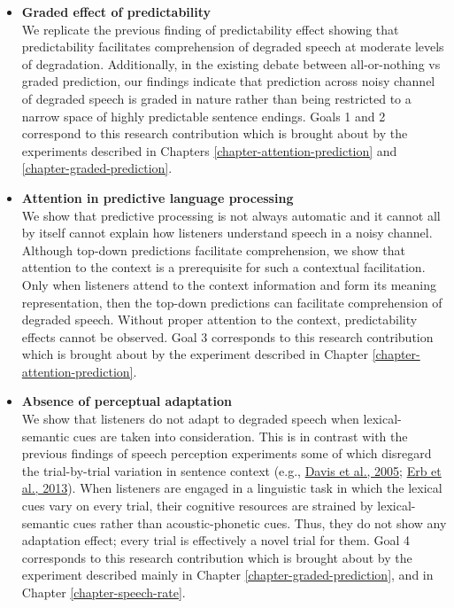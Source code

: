 \documentclass[a4paper, nobind]{templates/ociamthesis}
\begin{document}
\begin{itemize}
\item
  \textbf{Graded effect of predictability}\\
  We replicate the previous finding of predictability effect showing that predictability facilitates comprehension of degraded speech at moderate levels of degradation.
  Additionally, in the existing debate between all-or-nothing vs graded prediction, our findings indicate that prediction across noisy channel of degraded speech is graded in nature
  rather than being restricted to a narrow space of highly predictable sentence endings.
  Goals 1 and 2 correspond to this research contribution which is brought about by the experiments described in Chapters \ref{chapter-attention-prediction} and \ref{chapter-graded-prediction}.
\item
  \textbf{Attention in predictive language processing}\\
  We show that predictive processing is not always automatic and it cannot all by itself cannot explain how listeners understand speech in a noisy channel.
  Although top-down predictions facilitate comprehension, we show that attention to the context is a prerequisite for such a contextual facilitation.
  Only when listeners attend to the context information and form its meaning representation, then the top-down predictions can facilitate comprehension of degraded speech.
  Without proper attention to the context, predictability effects cannot be observed.
  Goal 3 corresponds to this research contribution which is brought about by the experiment described in Chapter \ref{chapter-attention-prediction}.
\item
  \textbf{Absence of perceptual adaptation}\\
  We show that listeners do not adapt to degraded speech when lexical-semantic cues are taken into consideration.
  This is in contrast with the previous findings of speech perception experiments some of which disregard the trial-by-trial variation in sentence context (e.g., \protect\hyperlink{ref-Davis2005}{Davis et al., 2005}; \protect\hyperlink{ref-Erb2013}{Erb et al., 2013}).
  When listeners are engaged in a linguistic task in which the lexical cues vary on every trial,
  their cognitive resources are strained by lexical-semantic cues rather than acoustic-phonetic cues.
  Thus, they do not show any adaptation effect;
  every trial is effectively a novel trial for them.
  Goal 4 corresponds to this research contribution which is brought about by the experiment described mainly in Chapter \ref{chapter-graded-prediction}, and in Chapter \ref{chapter-speech-rate}.

\end{itemize}
\end{document}
